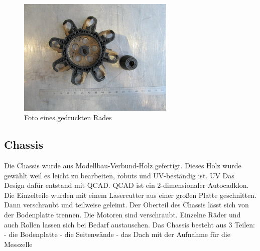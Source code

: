 \documentclass[a4paper,bibtotoc,oneside]{scrbook}
\begin{document}
\begin{figure}[htbp]
\centering
\includegraphics[width=75mm]{img/roller_wheel.jpg}
\caption[Foto eines gedruckten Rades]{Foto eines gedruckten Rades}\label{rollerad}
\end{figure}

\subsection{Chassis}\thispagestyle{empty}
Die Chassis wurde aus Modellbau-Verbund-Holz gefertigt. Dieses Holz wurde gewählt weil es leicht zu bearbeiten, robuts und UV-beständig ist. UV Das Design dafür entstand mit QCAD. QCAD ist ein 2-dimensionaler Autocadklon. Die Einzelteile wurden mit einem Lasercutter aus einer großen Platte geschnitten. Dann verschraubt und teilweise geleimt. Der Oberteil des Chassis lässt sich von der Bodenplatte trennen.
Die Motoren sind verschraubt. Einzelne Räder und auch Rollen lassen sich bei Bedarf austauschen.
Das Chassis besteht aus 3 Teilen: \newline
- die Bodenplatte
\newline
- die Seitenwände
\newline
- das Dach mit der Aufnahme für die Messzelle
\newline
\end{document}
